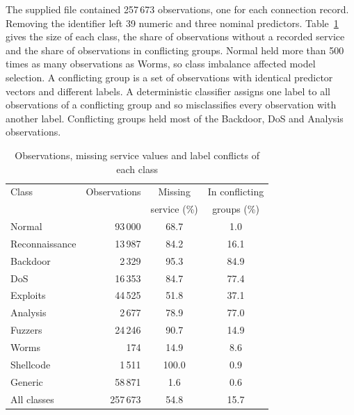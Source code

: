 \documentclass[conference]{IEEEtran}
\begin{document}
The supplied file contained 257\,673 observations, one for each connection record. Removing the identifier left 39 numeric and three nominal predictors. Table~\ref{tab:data} gives the size of each class, the share of observations without a recorded service and the share of observations in conflicting groups. Normal held more than 500 times as many observations as Worms, so class imbalance affected model selection. A conflicting group is a set of observations with identical predictor vectors and different labels. A deterministic classifier assigns one label to all observations of a conflicting group and so misclassifies every observation with another label. Conflicting groups held most of the Backdoor, DoS and Analysis observations.

\begin{table}[!t]
    \caption{Observations, missing service values and label conflicts of each class}
    \label{tab:data}
    \centering\footnotesize
    \begin{tabular}{@{}lrcc@{}}
        \toprule
        Class          & Observations      & Missing      & In conflicting \\
                       &           & service (\%) & groups (\%)    \\
        \midrule
        Normal         & 93\,000   & 68.7         & 1.0            \\
        Reconnaissance & 13\,987   & 84.2         & 16.1           \\
        Backdoor       & 2\,329    & 95.3         & 84.9           \\
        DoS            & 16\,353   & 84.7         & 77.4           \\
        Exploits       & 44\,525   & 51.8         & 37.1           \\
        Analysis       & 2\,677    & 78.9         & 77.0           \\
        Fuzzers        & 24\,246   & 90.7         & 14.9           \\
        Worms          & 174       & 14.9         & 8.6            \\
        Shellcode      & 1\,511    & 100.0        & 0.9            \\
        Generic        & 58\,871   & 1.6          & 0.6            \\
        \midrule
        All classes    & 257\,673  & 54.8         & 15.7           \\
        \bottomrule
    \end{tabular}
\end{table}
\end{document}
